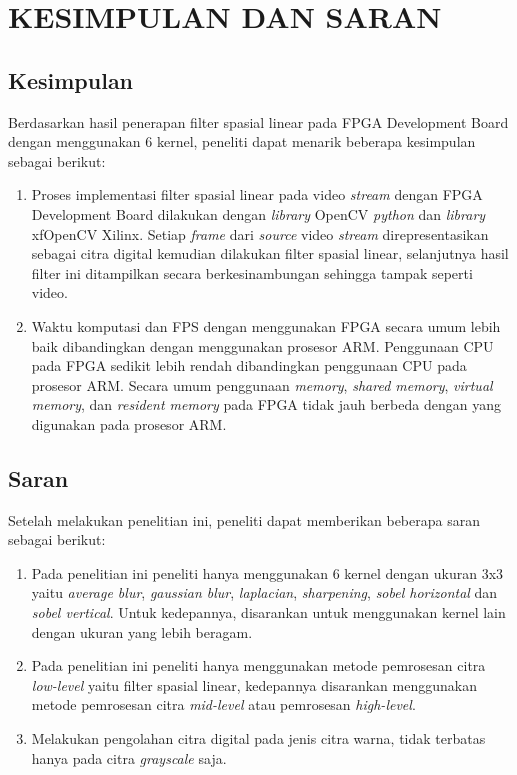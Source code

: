 
\chapter{KESIMPULAN DAN SARAN}

\section{Kesimpulan}
Berdasarkan hasil penerapan filter spasial linear pada FPGA Development Board dengan menggunakan 6 kernel, peneliti dapat menarik beberapa kesimpulan sebagai berikut:
\begin{enumerate}[topsep=0pt,itemsep=0pt,partopsep=0pt, parsep=0pt]
    \item Proses implementasi filter spasial linear pada video \textit{stream} dengan FPGA Development Board dilakukan dengan \textit{library} OpenCV \textit{python} dan \textit{library} xfOpenCV Xilinx. Setiap \textit{frame} dari \textit{source} video \textit{stream} direpresentasikan sebagai citra digital kemudian dilakukan filter spasial linear, selanjutnya hasil filter ini ditampilkan secara berkesinambungan sehingga tampak seperti video.
    \item Waktu komputasi dan FPS dengan menggunakan FPGA secara umum lebih baik dibandingkan dengan menggunakan prosesor ARM. Penggunaan CPU pada FPGA sedikit lebih rendah dibandingkan penggunaan CPU pada prosesor ARM. Secara umum penggunaan \textit{memory}, \textit{shared memory}, \textit{virtual memory}, dan \textit{resident memory} pada FPGA tidak jauh berbeda dengan yang digunakan pada prosesor ARM.
\end{enumerate}


\section{Saran}
Setelah melakukan penelitian ini, peneliti dapat memberikan beberapa saran sebagai berikut:
\begin{enumerate}[topsep=0pt,itemsep=0pt,partopsep=0pt, parsep=0pt]
    \item Pada penelitian ini peneliti hanya menggunakan 6 kernel dengan ukuran 3x3 yaitu \textit{average blur}, \textit{gaussian blur}, \textit{laplacian}, \textit{sharpening}, \textit{sobel horizontal} dan \textit{sobel vertical}. Untuk kedepannya, disarankan untuk menggunakan kernel lain dengan ukuran yang lebih beragam.
    \item Pada penelitian ini peneliti hanya menggunakan metode pemrosesan citra \textit{low-level} yaitu filter spasial linear, kedepannya disarankan menggunakan metode pemrosesan citra \textit{mid-level} atau pemrosesan \textit{high-level}.
    \item Melakukan pengolahan citra digital pada jenis citra warna, tidak terbatas hanya pada citra \textit{grayscale} saja.
\end{enumerate}